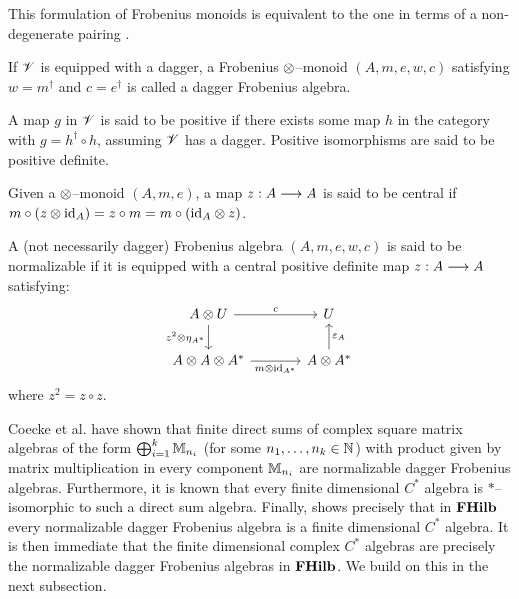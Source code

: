\begin{rmk}
This formulation of Frobenius monoids is equivalent to the one in terms of a
non-degenerate pairing \cite[Prop. 1]{NonCommTQFT}.
\end{rmk}

\begin{defn}
If $\mathscr{V}$ is equipped with a dagger, a Frobenius $\otimes$--monoid $(A, m, e, w, c)$
satisfying $w = m^{\dagger}$ and $c = e^{\dagger}$ is called a dagger Frobenius
algebra.
\end{defn}

\begin{defn}
A map $g$ in $\mathscr{V}$ is said to be positive if there exists some map $h$ in the
category with $g = h^{\dagger} \circ h$, assuming $\mathscr{V}$ has a dagger. Positive
isomorphisms are said to be positive definite.
\end{defn}

\begin{defn}[Centrality]
Given a $\otimes$--monoid $(A, m, e)$, a map $z : A \stackrel{}{\longrightarrow} A$ is said to be central if
$m \circ (z \otimes \text{id}_A) = z \circ m = m \circ (\text{id}_A \otimes z)$.
\end{defn}

\begin{defn}
A (not necessarily dagger) Frobenius algebra $(A, m, e, w, c)$ is said to be
normalizable if it is equipped with a central positive definite map
$z : A \stackrel{}{\longrightarrow} A$ satisfying:
\begin{eqnarray*}
\begin{tikzcd}[column sep=large]
A \m U \arrow[r, "c" above] \arrow[d, "z^2 \m \eta_{A^*}" left]&
U \\
A \m A \m A^* \arrow[r, "m \m \id_{A^*}" below] &
A \m A^* \arrow[u, "\eps_{A}" right]
\end{tikzcd}
\end{eqnarray*}
where $z^2 = z \circ z$.
\end{defn}

Coecke et al. \cite[10]{channels} have shown that finite direct sums of complex
square matrix algebras of the form $\bigoplus_{i = 1}^k \mathbb{M}_{n_i}$ (for some
$n_1, \dots, n_k \in \mathbb{N}$) with product given by matrix multiplication in every
component $\mathbb{M}_{n_i}$ are normalizable dagger Frobenius algebras. Furthermore, it
is known that every finite dimensional $C^*$ algebra is $*$--isomorphic to such
a direct sum algebra. Finally, \cite[Thm. 2.8]{channels} shows precisely that in
$\textbf{FHilb}$ every normalizable dagger Frobenius algebra is a finite dimensional
$C^*$ algebra. It is then immediate that the finite dimensional complex $C^*$
algebras are precisely the normalizable dagger Frobenius algebras in $\textbf{FHilb}$.
We build on this in the next subsection.

